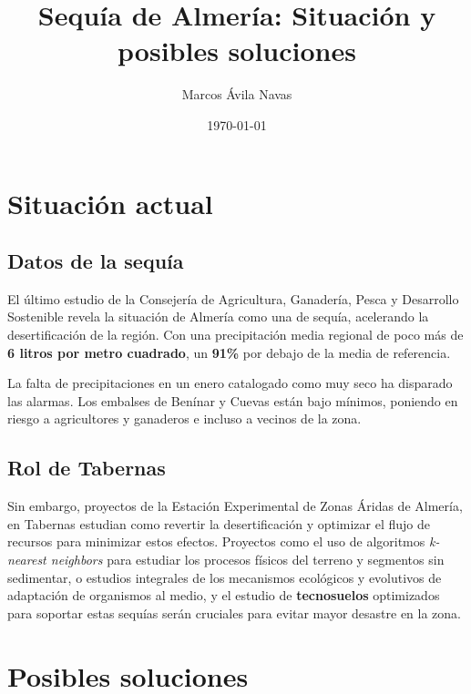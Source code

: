 \documentclass{article}
\title{Sequía de Almería: Situación y posibles soluciones}
\date{\today}
\author{Marcos Ávila Navas}
\begin{document}
\maketitle{}
\section{Situación actual}
\subsection{Datos de la sequía}
El último estudio de la Consejería de Agricultura, Ganadería, Pesca y Desarrollo Sostenible 
revela la situación de Almería como una de sequía, acelerando la desertificación de la región.
Con una 
precipitación media regional de poco más de \textbf{6 litros por metro cuadrado}, un \textbf{91\%} 
por debajo 
de la media de referencia.

La falta de precipitaciones en un enero catalogado como muy seco ha disparado las alarmas. 
Los embalses de Benínar y Cuevas están bajo mínimos, poniendo en riesgo a agricultores y ganaderos e incluso
a vecinos de la zona.
\subsection{Rol de Tabernas}
Sin embargo, proyectos de la Estación Experimental de Zonas Áridas de Almería, en Tabernas estudian como revertir 
la desertificación y optimizar el 
flujo de recursos para minimizar estos efectos. Proyectos como el uso de algoritmos \textit{k-nearest neighbors} para
estudiar los procesos físicos del terreno y segmentos sin sedimentar, o 
estudios integrales de los mecanismos ecológicos y evolutivos de adaptación de organismos al medio, y
el estudio de \textbf{tecnosuelos} optimizados para soportar estas sequías serán cruciales para evitar mayor desastre
en la zona.

\section{Posibles soluciones}
\end{document}
